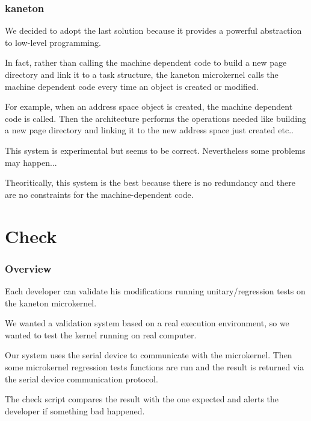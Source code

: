 \begin{frame}
  \frametitle{kaneton}

  We decided to adopt the last solution because it provides a powerful
  abstraction to low-level programming.

  \nl

  In fact, rather than calling the machine dependent code to build
  a new page directory and link it to a task structure, the kaneton
  microkernel calls the machine dependent code every time an
  object is created or modified.

  \nl

  For example, when an address space object is created, the machine
  dependent code is called. Then the architecture performs the operations
  needed like building a new page directory and linking it to the
  new address space just created etc..

  \nl

  This system is experimental but seems to be correct. Nevertheless some
  problems may happen...

  \nl

  Theoritically, this system is the best because there is no redundancy
  and there are no constraints for the machine-dependent code.
\end{frame}

%
%

\section{Check}


\begin{frame}
  \frametitle{Overview}

  Each  developer can validate his modifications running unitary/regression
  tests on the kaneton microkernel.

  \nl

  We wanted a validation system based on a real execution environment,
  so we wanted to test the kernel running on real computer.

  \nl

  Our system uses the serial device to communicate with the microkernel. Then
  some microkernel regression tests functions are run and the result
  is returned via the serial device communication protocol.

  \nl

  The check script compares the result with the one expected and alerts
  the developer if something bad happened.
\end{frame}

